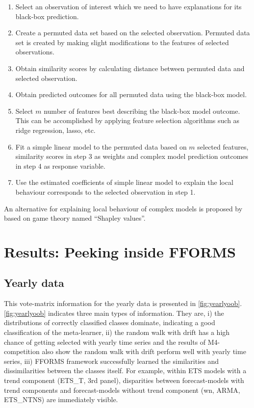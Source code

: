 \documentclass[11pt,a4paper,]{article}
\providecommand{\tightlist}{%
  \setlength{\itemsep}{0pt}\setlength{\parskip}{0pt}}
\begin{document}
\begin{enumerate}
\def\labelenumi{\arabic{enumi}.}
\tightlist
\item
  Select an observation of interest which we need to have explanations
  for its black-box prediction.
\item
  Create a permuted data set based on the selected observation. Permuted
  data set is created by making slight modifications to the features of
  selected observations.
\item
  Obtain similarity scores by calculating distance between permuted data
  and selected observation.
\item
  Obtain predicted outcomes for all permuted data using the black-box
  model.
\item
  Select \(m\) number of features best describing the black-box model
  outcome. This can be accomplished by applying feature selection
  algorithms such as ridge regression, lasso, etc.
\item
  Fit a simple linear model to the permuted data based on \(m\) selected
  features, similarity scores in step 3 as weights and complex model
  prediction outcomes in step 4 as response variable.
\item
  Use the estimated coefficients of simple linear model to explain the
  local behaviour corresponds to the selected observation in step 1.
\end{enumerate}

An alternative for explaining local behaviour of complex models is
proposed by \textcite{lundberg2017unified} based on game theory named
``Shapley values''.

\clearpage

\section{Results: Peeking inside FFORMS}\label{results2}

\subsection{Yearly data}\label{yearly-data}

This vote-matrix information for the yearly data is presented in
\autoref{fig:yearlyoob}. \autoref{fig:yearlyoob} indicates three main
types of information. They are, i) the distributions of correctly
classified classes dominate, indicating a good classification of the
meta-learner, ii) the random walk with drift has a high chance of
getting selected with yearly time series and the results of
M4-competition also show the random walk with drift perform well with
yearly time series, iii) FFORMS framework successfully learned the
similarities and dissimilarities between the classes itself. For
example, within ETS models with a trend component (ETS\_T, 3rd panel),
disparities between forecast-models with trend components and
forecast-models without trend component (wn, ARMA, ETS\_NTNS) are
immediately visible.
\end{document}
